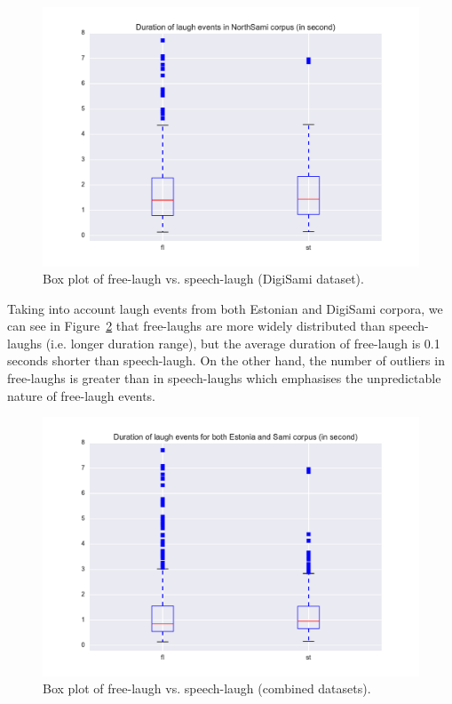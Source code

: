 \documentclass[10pt,journal,compsoc]{IEEEtran}
\begin{document}
\begin{figure}[!t]
\centering
\includegraphics[width=1\linewidth]{figures/sami/duration_boxplot_laugh.pdf}
\caption{Box plot of free-laugh vs. speech-laugh (DigiSami dataset).}
\label{fig:DS-duration-boxplot-laugh}
\end{figure}

Taking into account laugh events from both Estonian and DigiSami corpora, we can see in Figure~\ref{fig:all-duration-boxplot-laugh} that free-laughs are more widely distributed than speech-laughs (i.e. longer duration range), but the average duration of free-laugh is 0.1 seconds shorter than speech-laugh. On the other hand, the number of outliers in free-laughs is greater than in speech-laughs which emphasises the unpredictable nature of free-laugh events.

\begin{figure}[!t]
\centering
\includegraphics[width=1\linewidth]{figures/all/duration_boxplot_laugh.pdf}
\caption{Box plot of free-laugh vs. speech-laugh (combined datasets).}
\label{fig:all-duration-boxplot-laugh}
\end{figure}
\end{document}
